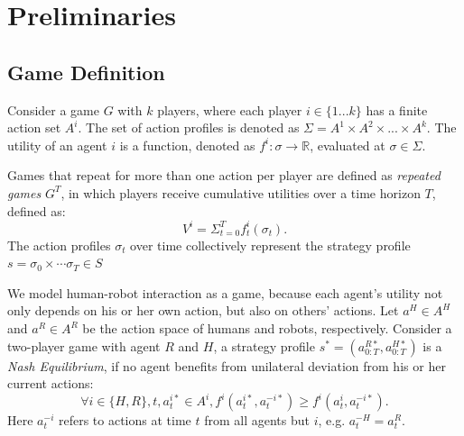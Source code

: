 \documentclass[letterpaper, 10 pt, conference]{ieeeconf}  %
\begin{document}




\section{Preliminaries}
\vspace{-.2em}
\subsection{Game Definition}
\vspace{-.2em}
Consider a game $G$ with $k$ players, where each player $i \in \{1...k\}$ has 
a finite action set $A^i$. The set of action profiles is denoted as 
$\Sigma = A^1 \times A^2 \times ... \times A^k$. The utility of an 
agent $i$ is a function, denoted as $f^i: \sigma \rightarrow \mathbb{R} $, 
evaluated at $\sigma \in \Sigma$. 

Games that repeat for more than one action per player are defined as 
\textit{repeated games} $G^T$, in which players receive cumulative utilities over a 
time horizon $T$, defined as:
\begin{equation}
  V^i=\Sigma_{t=0}^{T} f^i_t(\sigma_t).
\end{equation}
The action profiles $\sigma_t$ over time collectively represent the 
strategy profile $s = \sigma_0 \times \cdots \sigma_T \in S$ 

We model human-robot interaction as a game, because each agent's utility not 
only depends on his or her own action, but also on others' actions. Let 
$a^H \in A^H$ and $a^R \in A^R$ be the action space of humans and robots, 
respectively. Consider a two-player game with agent $R$ and $H$, a strategy profile $s^* = (a^{R*}_{0:T},a^{H*}_{0:T})$ is a \textit{Nash Equilibrium}, if no 
agent benefits from unilateral deviation from his or her current actions:
\begin{equation}
  \forall i \in \{H,R\}, t,a^{i*}_t \in A^i, f^i(a^{i*}_t,a^{-i*}_t) \geq f^i(a^{i}_t,a^{-i*}_t). 
\end{equation}
Here $a^{-i}_t$ refers to actions at time $t$ from all agents but $i$, e.g. $a_t^{-H} = a_t^R$. 
\end{document}
